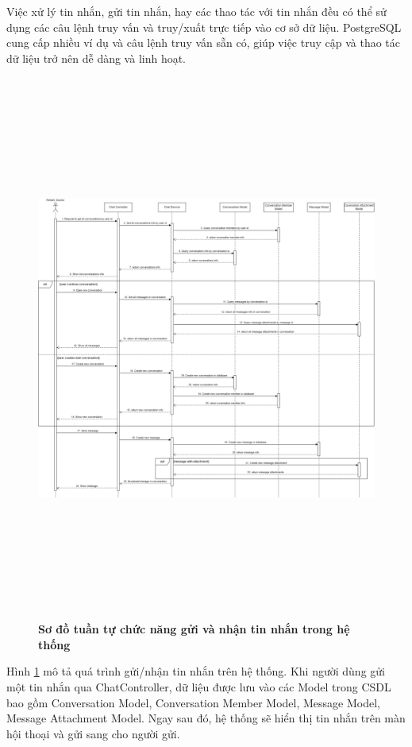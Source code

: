 Việc xử lý tin nhắn, gửi tin nhắn, hay các thao tác với tin nhắn đều có thể sử dụng
các câu lệnh truy vấn và truy/xuất trực tiếp vào cơ sở dữ liệu. PostgreSQL cung cấp nhiều
ví dụ và câu lệnh truy vấn sẵn có, giúp việc truy cập và thao tác dữ liệu trở nên dễ dàng và linh hoạt.

\begin{figure}[H]
  \centering
  \includegraphics[width=16cm,height=18cm]{Images/sequence_api/sendGetMessage.png}
  \caption[Sơ đồ tuần tự chức năng gửi và nhận tin nhắn trong hệ thống]{\bfseries \fontsize{12pt}{0pt}
  \selectfont Sơ đồ tuần tự chức năng gửi và nhận tin nhắn trong hệ thống}
  \label{api_sendMessage} %
\end{figure}
Hình \ref{api_sendMessage} mô tả quá trình gửi/nhận tin nhắn trên hệ thống. Khi người dùng gửi một tin nhắn qua ChatController, dữ liệu được lưu vào các Model trong CSDL bao gồm Conversation Model, 
Conversation Member Model, Message Model, Message Attachment Model. Ngay sau đó, hệ thống sẽ hiển thị tin nhắn trên màn hội thoại và gửi sang cho người gửi. 
